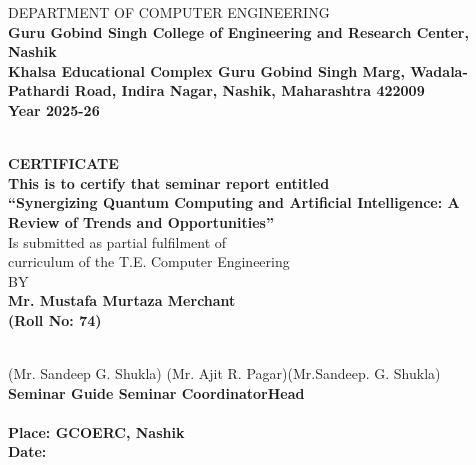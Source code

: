 	\thisfancypage{\setlength{\fboxsep}{10pt}\doublebox}{}	
	\begin{titlepage}
		\begin{center}
		{\large{ DEPARTMENT OF COMPUTER ENGINEERING}}\\
		{ \large\bf Guru Gobind Singh College of Engineering and Research Center, Nashik}\\ 
		{\bf Khalsa Educational Complex Guru Gobind Singh Marg, Wadala-Pathardi Road, Indira Nagar, Nashik, Maharashtra 422009}\\
		{\bf Year 2025-26}
		\vspace{0.2in}
		\begin{figure*}[!h]
		\centerline{}
		\label{atcres}
		\end{figure*}
		\vspace{0.2in}\\
		{\large\textbf{CERTIFICATE}}\\
		{\small \bf This is to certify that seminar report entitled}\\
		\vspace{0.2in}
		{\large \bf {``Synergizing Quantum Computing and Artificial Intelligence: A Review of Trends and Opportunities''}}\\
		\vspace{0.2in}
		{\small Is submitted as partial fulfilment of \\curriculum of the T.E. Computer Engineering}\\
		\vspace{0.2in}
		BY\\
		\vspace{0.2in}
		{\bf Mr. Mustafa Murtaza Merchant} \hspace{0.1in} \\{\bf (Roll No: 74)}\\
		
		\end{center}
		\vspace*{0.4in}\\
		\hspace{0.2in}(Mr. Sandeep G. Shukla)\hspace{0.2in} (Mr. Ajit R. Pagar)\hspace{0.2in}(Mr.Sandeep. G. Shukla)\\
		\hspace*{0.4in}\bf{Seminar Guide} \hspace*{0.6in}\bf{Seminar Coordinator}\hspace*{0.7in}\bf{Head}\\
		\vspace*{0.2in}\\
		\hspace*{0.4in}Place: {GCOERC, Nashik}\\
		\hspace*{0.4in}Date:
	\end{titlepage}